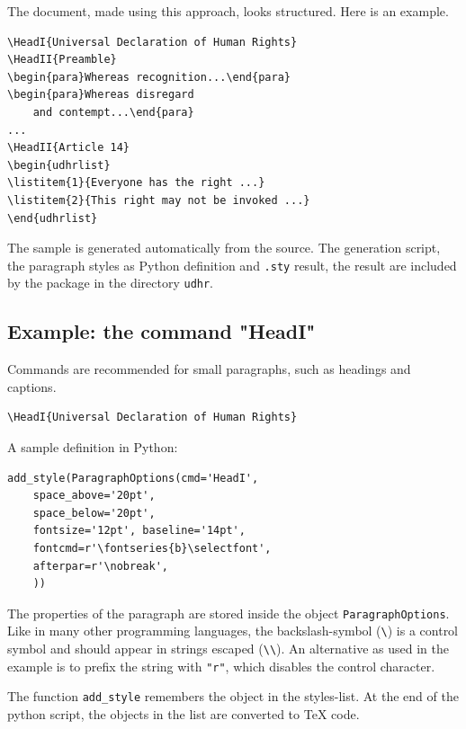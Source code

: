 \documentclass[]{ltugboat}
\begin{document}
The document, made using this approach, looks structured. Here is an example.

\begin{verbatim}
\HeadI{Universal Declaration of Human Rights}
\HeadII{Preamble}
\begin{para}Whereas recognition...\end{para}
\begin{para}Whereas disregard
    and contempt...\end{para}
...
\HeadII{Article 14}
\begin{udhrlist}
\listitem{1}{Everyone has the right ...}
\listitem{2}{This right may not be invoked ...}
\end{udhrlist}
\end{verbatim}

The sample is generated automatically from the \XML{} source. The generation script, the paragraph styles as Python definition and \verb|.sty| result, the result are included by the package in the directory \verb|udhr|.

\subsection{Example: the command "HeadI"}

Commands are recommended for small paragraphs, such as headings and captions.

\begin{verbatim}
\HeadI{Universal Declaration of Human Rights}
\end{verbatim}

A sample definition in Python:

\begin{verbatim}
add_style(ParagraphOptions(cmd='HeadI',
    space_above='20pt',
    space_below='20pt',
    fontsize='12pt', baseline='14pt',
    fontcmd=r'\fontseries{b}\selectfont',
    afterpar=r'\nobreak',
    ))
\end{verbatim}

The properties of the paragraph are stored inside the object \verb|ParagraphOptions|. Like in many other programming languages, the backslash-symbol (\verb|\|) is a control symbol and should appear in strings escaped (\verb|\\|). An alternative as used in the example is to prefix the string with \verb|"r"|, which disables the control character.

The function \verb|add_style| remembers the object in the styles-list. At the end of the python script, the objects in the list are converted to \TeX{} code.
\end{document}
